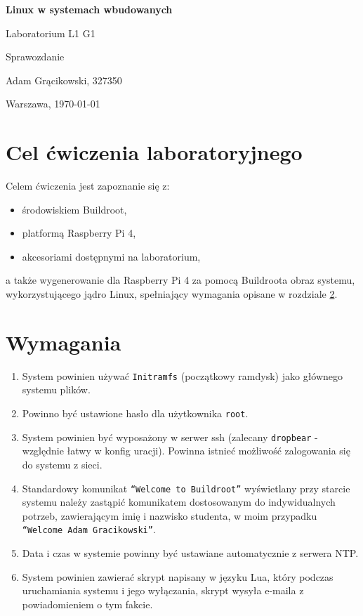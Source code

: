 \documentclass{article}
\begin{document}
\begin{titlepage}
    \centering
    \vfill    
    {\fontsize{40}{20}\selectfont \textbf{Linux w systemach wbudowanych} \par}
    \vspace{2cm}
    {\fontsize{30}{20}\selectfont Laboratorium L1 G1\par}
    \vspace{2cm}
    {\fontsize{20}{20}\selectfont Sprawozdanie\par}
    \vfill
    {\fontsize{15}{20}\selectfont Adam Grącikowski, 327350\par}
    \vspace{1cm}
    Warszawa, \today
\end{titlepage}



\section{Cel ćwiczenia laboratoryjnego}
\label{Cel}

 Celem ćwiczenia jest zapoznanie się z:

 \begin{itemize}
     \item środowiskiem Buildroot,
     \item platformą Raspberry Pi 4,
     \item akcesoriami dostępnymi na laboratorium,
 \end{itemize}

a także wygenerowanie dla Raspberry Pi 4 za pomocą Buildroota obraz systemu, wykorzystującego jądro Linux, spełniający wymagania opisane w rozdziale \ref{Wymagania}.

\section{Wymagania}
\label{Wymagania}

\begin{enumerate}[label=\arabic*.]
    \item System powinien używać \texttt{Initramfs} (początkowy ramdysk) jako głównego systemu plików.
    \item Powinno być ustawione hasło dla użytkownika  \texttt{root}.
    \item System powinien być wyposażony w serwer ssh (zalecany  \texttt{dropbear} - względnie łatwy w konfig
    uracji). Powinna istnieć możliwość zalogowania się do systemu z sieci.
    \item Standardowy komunikat  \texttt{“Welcome to Buildroot”} wyświetlany przy starcie systemu należy zastąpić komunikatem dostosowanym do indywidualnych potrzeb, zawierającym imię i nazwisko studenta,
    w moim przypadku \texttt{“Welcome Adam Gracikowski”}.
    \item Data i czas w systemie powinny być ustawiane automatycznie z serwera NTP.
    \item  System powinien zawierać skrypt napisany w języku Lua, który podczas uruchamiania systemu i jego wyłączania, skrypt wysyła e-maila z powiadomieniem o tym
    fakcie.
\end{enumerate}
\end{document}

